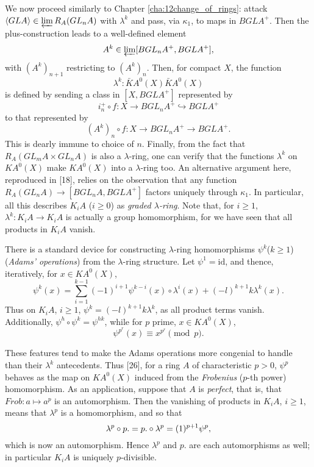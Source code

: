 \documentclass[openany,leqno]{book}  %
\newcommand{\id}{\mathrm{id}} %
\begin{document}
We now proceed similarly to Chapter \ref{cha:12change_of_rings}: attack $\langle GLA \rangle \in \varprojlim R_A(GL_nA)$ with $\lambda^k$ and pass, via $\kappa_1$, to maps in $BGLA^+$. Then the plus-construction leads to a well-defined element
\[A^k \in \varprojlim [BGL_nA^+, BGLA^+],\]
with $(A^k)_{n+1}$ restricting to $(A^k)_{n}$. Then, for compact $X$, the function 
\[\lambda^k \colon \bar{K}A^0(X) \bar{K}A^0(X)\]
is defined by sending a class in $[X, BGLA^+]$ represented by 
\[i_n^+\circ f \colon X \longrightarrow BGL_nA^+ \hookrightarrow BGLA^+\]
to that represented by
\[(A^k)_n \circ  f : X \longrightarrow BGL_nA^+ \longrightarrow BGLA^+ .\]
This is dearly immune to choice of $n$. Finally, from the fact that $R_A(GL_mA \times GL_nA)$ is also a $\lambda$-ring, one can verify that the functions $\lambda^k$ on $KA^0(X)$ make $KA^0(X)$ into a $\lambda$-ring too. An alternative argument here, reproduced in [18], relies on the observation that any function $R_A(GL_nA) \longrightarrow [BGL_nA, BGLA^+]$ factors uniquely through $\kappa_1$. In particular, all this describes $K_iA$ ($i \geqslant 0$) as {\em graded $\lambda$-ring}. Note that, for $i \geqslant 1$, $\lambda^k \colon K_iA \longrightarrow K_iA$ is actually a group homomorphism, for we have seen that all products in $K_iA$ vanish.

There is a standard device for constructing $\lambda$-ring homomorphisms $\psi^k$($k \geqslant 1$) ({\em Adams' operations}) from the $\lambda$-ring structure. Let $\psi^1 = \id$, and thence, iteratively, for $x \in KA^0(X)$,
\[\psi^k(x) = \sum_{i=1}^{k-1} (-1)^{i+1}\psi^{k-i}(x)\circ \lambda^i(x) + (-l)^{k+1}k\lambda^k(x).\]
Thus on $K_iA$, $i\geqslant 1$, $\psi^k= (-l)^{k+1}k\lambda^k$, as all product terms vanish. Additionally, $\psi^h\circ \psi^k=\psi^{hk}$, while for $p$ prime, $x \in KA^0(X)$,
\[\psi^{p^r}(x) \equiv x^{p^r} \pmod p.\]

These features tend to make the Adams operations more congenial to handle than their $\lambda^k$ antecedents. Thus [26], for a ring $A$ of characteristic $p > 0$, $\psi^p$ behaves as the map on $KA^0(X)$ induced from the {\em Frobenius} ($p$-th power) homomorphism. As an application, suppose that $A$ is {\em perfect}, that is, that $Frob\colon a \mapsto a^p$ is an automorphism. Then the vanishing of products in $K_iA$, $i \geqslant 1$, means that $\lambda^p$ is a homomorphism, and so that
\[\lambda^p \circ p. = p. \circ \lambda^p = (\-1)^{p+1}\psi^p ,\]
which is now an automorphism. Hence $\lambda^p$ and $p.$ are each automorphisms as well; in particular $K_iA$ is uniquely $p$-divisible.
\end{document}
